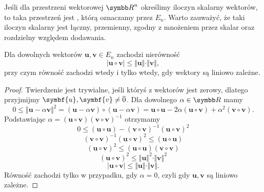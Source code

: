 Jeśli dla przestrzeni wektorowej $\RR^n$ określimy iloczyn skalarny wektorów, to taka przestrzeń jest , którą oznaczamy przez $E_n$. Warto zauważyć, że taki iloczyn skalarny jest łączny, przemienny, zgodny z mnożeniem przez skalar oraz rozdzielny względem dodawania.

\begin{theorem}
    Dla dowolnych wektorów $\symbf{u}, \symbf{v} \in E_n$ zachodzi nierówność
    \[ |\symbf{u} \circ \symbf{v}| \leq \Vert \symbf{u} \Vert \cdot \Vert \symbf{v} \Vert, \]
    przy czym równość zachodzi wtedy i tylko wtedy, gdy wektory są liniowo zależne.
\end{theorem}
\begin{proof}
    Twierdzenie jest trywialne, jeśli któryś z wektorów jest zerowy, dlatego przyjmijmy $\symbf{u}, \symbf{v} \neq \ol{0}$. Dla dowolnego $\alpha \in \RR$ mamy
    \[ 0 \leq \Vert\symbf{u} - \alpha\symbf{v}\Vert^2 = (\symbf{u} - \alpha\symbf{v}) \circ (\symbf{u} - \alpha\symbf{v}) = \symbf{u} \circ \symbf{u} - 2\alpha(\symbf{u} \circ \symbf{v}) + \alpha^2(\symbf{v} \circ \symbf{v}). \]
    Podstawiając $\alpha = (\symbf{u} \circ \symbf{v})(\symbf{v} \circ \symbf{v})^{-1}$ otrzymamy
    \[ 0 \leq (\symbf{u} \circ \symbf{u}) - (\symbf{v} \circ \symbf{v})^{-1}(\symbf{u} \circ \symbf{v})^2 \]
    \[ (\symbf{v} \circ \symbf{v})^{-1}(\symbf{u} \circ \symbf{v})^2 \leq (\symbf{u} \circ \symbf{u}) \]
    \[ (\symbf{u} \circ \symbf{v})^2 \leq (\symbf{u} \circ \symbf{u})(\symbf{v} \circ \symbf{v}) \]
    \[ (\symbf{u} \circ \symbf{v})^2 \leq \Vert \symbf{u} \Vert^2 \cdot \Vert \symbf{v} \Vert^2 \]
    \[ |\symbf{u} \circ \symbf{v}| \leq \Vert \symbf{u} \Vert \cdot \Vert \symbf{v} \Vert. \]
    Równość zachodzi tylko w przypadku, gdy $\alpha = 0$, czyli gdy $\symbf{u}, \symbf{v}$ są liniowo zależne.
\end{proof}

